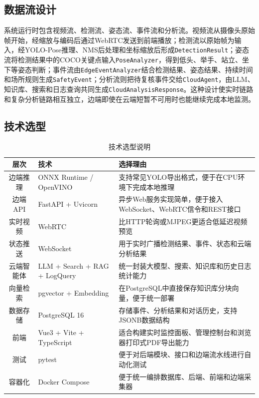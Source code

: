 \subsection{数据流设计}

系统运行时包含视频流、检测流、姿态流、事件流和分析流。视频流从摄像头原始帧开始，经缩放与编码后通过WebRTC发送到前端播放；检测流以原始帧为输入，经YOLO-Pose推理、NMS后处理和坐标缩放后形成\verb|DetectionResult|；姿态流将检测结果中的COCO关键点输入\verb|PoseAnalyzer|，得到低头、举手、站立、坐下等姿态判断；事件流由\verb|EdgeEventAnalyzer|结合检测结果、姿态结果、持续时间和场所规则生成\verb|SafetyEvent|；分析流则把待复核事件交给\verb|CloudAgent|，由LLM、知识库、搜索和日志查询共同生成\verb|CloudAnalysisResponse|。这种设计使实时链路和复杂分析链路相互独立，边端即使在云端短暂不可用时也能继续完成本地监测。

\subsection{技术选型}

\begin{table}[H]
\caption{技术选型说明}
\begin{center}
\begin{tabular}{clp{8.5cm}}
\toprule
层次 & 技术 & 选择理由 \\
\midrule
边端推理   & ONNX Runtime / OpenVINO  & 支持常见YOLO导出格式，便于在CPU环境下完成本地推理 \\
边端API    & FastAPI + Uvicorn        & 异步Web服务实现简单，便于接入WebSocket、WebRTC信令和REST接口 \\
实时视频   & WebRTC                   & 比HTTP轮询或MJPEG更适合低延迟视频预览 \\
状态推送   & WebSocket                & 用于实时广播检测结果、事件、状态和云端分析结果 \\
云端智能体 & LLM + Search + RAG + LogQuery & 统一封装大模型、搜索、知识库和历史日志统计能力 \\
向量检索   & pgvector + Embedding     & 在PostgreSQL中直接保存知识库分块向量，便于统一部署 \\
数据存储   & PostgreSQL 16            & 存储事件、分析结果和对话历史，支持JSONB数据结构 \\
前端       & Vue3 + Vite + TypeScript & 适合构建实时监控面板、管理控制台和浏览器打印式PDF导出能力 \\
测试       & pytest                   & 便于对后端模块、接口和边端流水线进行自动化测试 \\
容器化     & Docker Compose           & 便于统一编排数据库、后端、前端和边端采集器 \\
\bottomrule
\end{tabular}
\end{center}
\label{tb:tech}
\end{table}

